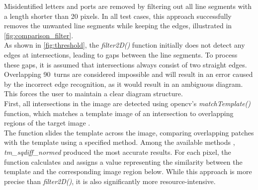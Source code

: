 Misidentified letters and ports are removed by filtering out all line segments with a length shorter than 20 pixels. In all test cases, this approach successfully removes the unwanted line segments while keeping the edges, illustrated in \autoref{fig:comparison_filter}.\\
As shown in \autoref{fig:threshold}, the \textit{filter2D()} function initially does not detect any edges at intersections, leading to gaps between the line segments. To process these gaps, it is assumed that intersections always consist of two straight edges. Overlapping 90\textdegree\ turns are considered impossible and will result in an error caused by the incorrect edge recognition, as it would result in an ambiguous diagram. This forces the user to maintain a clear diagram structure.\\
First, all intersections in the image are detected using \acrshort{opencv}'s \textit{matchTemplate()} function, which matches a template image of an intersection to overlapping regions of the target image \cite{opencv_matchTemplate_2024}.\\
The function slides the template across the image, comparing overlapping patches with the template using a specified method. Among the available methods \cite{opencv_comparison_methods_2024}, \textit{tm\_sqdiff\_normed} produced the most accurate results. For each pixel, the function calculates and assigns a value representing the similarity between the template and the corresponding image region below. While this approach is more precise than \textit{filter2D()}, it is also significantly more resource-intensive.\\


